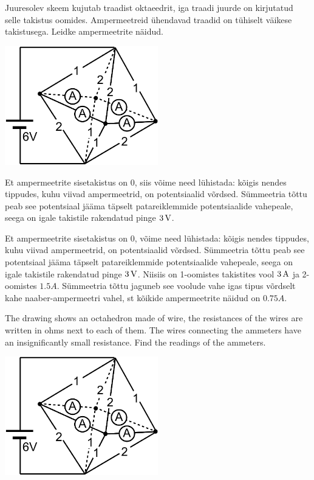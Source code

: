 
Juuresolev skeem kujutab traadist oktaeedrit, iga traadi juurde on kirjutatud selle takistus oomides. 
Ampermeetreid ühendavad traadid on tühiselt väikese takistusega.
Leidke ampermeetrite näidud.

\begin{center}
\includegraphics[width=0.5\textwidth]{2016-lahg-08-ampermeeterjoonis.png}
\end{center}

\hint
Et ampermeetrite sisetakistus on \num{0}, siis võime need lühistada: kõigis nendes tippudes, kuhu viivad ampermeetrid, on potentsiaalid võrdsed. Sümmeetria tõttu peab see 
potentsiaal jääma täpselt patareiklemmide potentsiaalide vahepeale, seega on igale takistile rakendatud pinge
$\SI 3V$.

\solu
Et ampermeetrite sisetakistus on \num{0}, võime need lühistada: kõigis nendes tippudes, kuhu viivad ampermeetrid, on potentsiaalid võrdsed. Sümmeetria tõttu peab see 
potentsiaal jääma täpselt patareiklemmide potentsiaalide vahepeale, seega on igale takistile rakendatud pinge
$\SI 3V$. Niisiis on 1-oomistes takistites vool $\SI 3A$ ja 2-oomistes $\SI {1.5}A$. Sümmeetria tõttu 
jaguneb see voolude vahe igas tipus võrdselt kahe naaber-ampermeetri vahel, st kõikide ampermeetrite näidud on 
$\SI {0.75}A$.

The drawing shows an octahedron made of wire, the resistances of the wires are written in ohms next to each of them. The wires connecting the ammeters have an insignificantly small resistance. Find the readings of the ammeters.
\begin{center}
\includegraphics[width=0.5\textwidth]{2016-lahg-08-ampermeeterjoonis}
\end{center}

